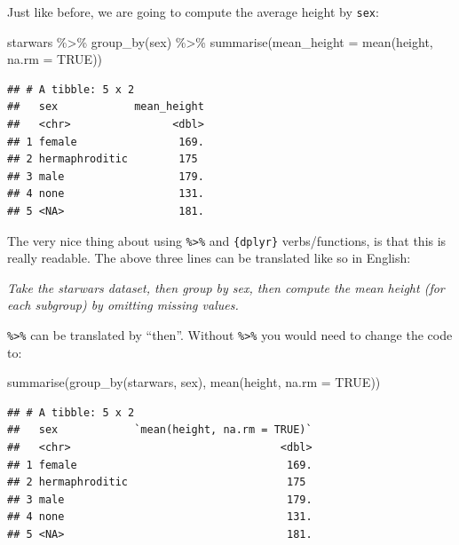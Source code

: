 \documentclass[
]{article}
\newenvironment{Shaded}{\begin{snugshade}}{\end{snugshade}}
\newcommand{\AttributeTok}[1]{\textcolor[rgb]{0.77,0.63,0.00}{#1}}
\newcommand{\ConstantTok}[1]{\textcolor[rgb]{0.00,0.00,0.00}{#1}}
\newcommand{\FunctionTok}[1]{\textcolor[rgb]{0.00,0.00,0.00}{#1}}
\newcommand{\NormalTok}[1]{#1}
\newcommand{\SpecialCharTok}[1]{\textcolor[rgb]{0.00,0.00,0.00}{#1}}
\begin{document}
Just like before, we are going to compute the average height by \texttt{sex}:

\begin{Shaded}
\begin{Highlighting}[]
\NormalTok{starwars }\SpecialCharTok{\%\textgreater{}\%}
  \FunctionTok{group\_by}\NormalTok{(sex) }\SpecialCharTok{\%\textgreater{}\%}
  \FunctionTok{summarise}\NormalTok{(}\AttributeTok{mean\_height =} \FunctionTok{mean}\NormalTok{(height, }\AttributeTok{na.rm =} \ConstantTok{TRUE}\NormalTok{))}
\end{Highlighting}
\end{Shaded}

\begin{verbatim}
## # A tibble: 5 x 2
##   sex            mean_height
##   <chr>                <dbl>
## 1 female                169.
## 2 hermaphroditic        175 
## 3 male                  179.
## 4 none                  131.
## 5 <NA>                  181.
\end{verbatim}

The very nice thing about using \texttt{\%\textgreater{}\%} and \texttt{\{dplyr\}} verbs/functions, is that this is really
readable. The above three lines can be translated like so in English:

\emph{Take the starwars dataset, then group by sex, then compute the mean height (for each subgroup) by
omitting missing values.}

\texttt{\%\textgreater{}\%} can be translated by ``then''. Without \texttt{\%\textgreater{}\%} you would need to change the code to:

\begin{Shaded}
\begin{Highlighting}[]
\FunctionTok{summarise}\NormalTok{(}\FunctionTok{group\_by}\NormalTok{(starwars, sex), }\FunctionTok{mean}\NormalTok{(height, }\AttributeTok{na.rm =} \ConstantTok{TRUE}\NormalTok{))}
\end{Highlighting}
\end{Shaded}

\begin{verbatim}
## # A tibble: 5 x 2
##   sex            `mean(height, na.rm = TRUE)`
##   <chr>                                 <dbl>
## 1 female                                 169.
## 2 hermaphroditic                         175 
## 3 male                                   179.
## 4 none                                   131.
## 5 <NA>                                   181.
\end{verbatim}
\end{document}
